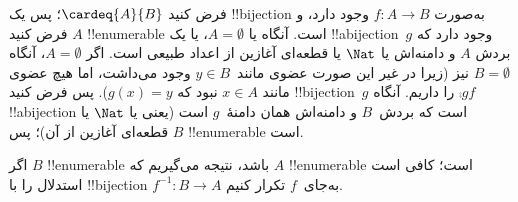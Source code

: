  {
  فرض کنید $\cardeq{A}{B}$؛ پس یک !!{bijection} به‌صورت $f \colon A
  \to B$ وجود دارد، و فرض کنید $A$ !!{enumerable} است.
  {
    آنگاه یا $A  = \emptyset$، یا یک !!a{bijection}~$g$ وجود دارد که
    بردش $A$ و دامنه‌اش یا $\Nat$ یا قطعه‌ای آغازین از اعداد طبیعی
    است. اگر $A = \emptyset$، آنگاه $B =
    \emptyset$ نیز (زیرا در غیر این صورت عضوی مانند~$y \in B$ وجود می‌داشت، اما
    هیچ عضوی مانند $x
    \in A$ نبود که $g(x) = y$). پس فرض کنید !!{bijection}~$g$ را
    داریم. آنگاه $\comp{g}{f}$ !!a{bijection} است که بردش~$B$ و دامنه‌اش
    همان دامنهٔ~$g$ است (یعنی یا $\Nat$ یا قطعه‌ای آغازین از آن)؛ پس
    $B$ !!{enumerable} است.}

  اگر $B$ !!{enumerable} باشد، نتیجه می‌گیریم که $A$ !!{enumerable} است؛
  کافی است استدلال را با !!{bijection} $f^{-1}\colon B \to A$ به‌جای~$f$
  تکرار کنیم.
 }

